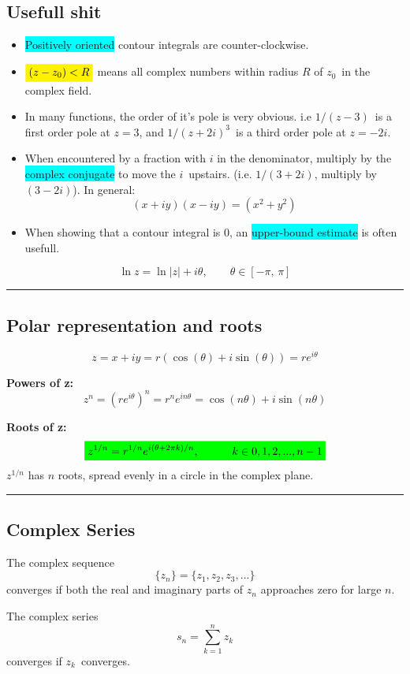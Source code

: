 \documentclass[10pt,a4paper]{article}
\renewcommand{\exp}{e^}
\newcommand{\holine}[1][\medskipamount]{\par\vspace*{\dimexpr-\parskip-\baselineskip+#1}\noindent\rule{\linewidth}{1pt}\par\vspace*{\dimexpr-\parskip-.5\baselineskip+#1}}
\newcommand{\yl}[1]{\colorbox{yellow}{$\displaystyle #1$}}
\newcommand{\gr}[1]{\colorbox{green}{$\displaystyle #1$}}
\newcommand{\bll}{\colorbox{cyan}}
\begin{document}
\begin{multicols}{2}
\subsection*{Usefull shit}

\begin{itemize}
    \item \bll{Positively oriented} contour integrals are counter-clockwise.
    \item $\yl{(z-z_0)<R}$ means all complex numbers within radius $R$ of $z_0$ in the complex field.
    \item In many functions, the order of it's pole is very obvious. i.e $1/(z-3)$ is a first order pole at $z=3$, and $1/(z+2i)^3$ is a third order pole at $z=-2i$.
    \item When encountered by a fraction with $i$ in the denominator, multiply by the \bll{complex conjugate} to move the $i$ upstairs. (i.e. $1/(3+2i)$, multiply by $(3-2i)$). In general:
    \[
        (x+iy)(x-iy) = (x^2 + y^2)
    \]
    \item When showing that a contour integral is 0, an \bll{upper-bound estimate} is often usefull.
\end{itemize}

\[
    \ln{z} = \ln|z| + i\theta, \quad\quad \theta\in[-\pi,\, \pi]
\]



\holine
\subsection*{Polar representation and roots}
\[
    z = x + iy = r(\cos(\theta) + i\sin(\theta)) = r\exp{i\theta}
\]

\textbf{Powers of z:}
\[
    z^n = (r\exp{i\theta})^n = r^n\exp{in\theta} = \cos(n\theta) + i \sin(n\theta)
\]

\textbf{Roots of z:} 
\[\gr{
    z^{1/n} = r^{1/n}\exp{i(\theta + 2\pi k)/n}, \quad\quad\quad k\in 0,1,2,...,n-1
}\]
$z^{1/n}$ has $n$ roots, spread evenly in a circle in the complex plane.



\holine
\subsection*{Complex Series}
The complex sequence
\[
    \{z_n\} = \{z_1, z_2, z_3, ...\}
\]
converges if both the real and imaginary parts of $z_n$ approaches zero for large $n$.

The complex series
\[
    s_n = \sum_{k=1}^n z_k
\]
converges if $z_k$ converges.


\end{multicols}
\end{document}
